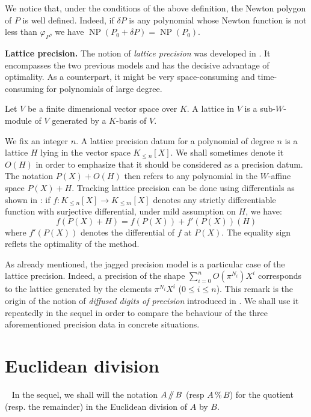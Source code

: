 \documentclass{sig-alternate-2013}
\DeclareMathOperator{\NP}{NP}
\renewcommand{\mod}{\,\%\,}
\renewcommand{\div}{\,/\hspace{-0.3em}/\,}
\def\todo#1{\ \!\!{\color{red} #1}}
\begin{document}
We notice that, under the conditions of the above definition, the
Newton polygon of $P$ is well defined. Indeed, if $\delta P$ is any
polynomial whose Newton function is not less than $\varphi_P$, we
have $\NP(P_0 + \delta P) = \NP(P_0)$.

\medskip

\noindent
{\bf Lattice precision.}
The notion of \emph{lattice precision} was developed in 
\cite{padicprec}. It encompasses the two previous models and has
the decisive advantage of optimality. As a counterpart, it might be
very space-consuming and time-consuming for polynomials of large
degree.

\begin{deftn}
Let $V$ be a finite dimensional vector space over $K$. A lattice
in $V$ is a sub-$W$-module of $V$ generated by a $K$-basis of
$V$.
\end{deftn}

\noindent
We fix an integer $n$. A lattice precision datum for a polynomial of 
degree $n$ is a lattice $H$ lying in the vector space $K_{\leq n}[X]$. 
We shall sometimes denote it $O(H)$ in order to emphasize that it should 
be considered as a precision datum. The notation $P(X) + O(H)$ then 
refers to any polynomial in the $W$-affine space $P(X) + H$. Tracking
lattice precision can be done using differentials as shown in
\cite[Lemma~3.4 and Proposition~3.12]{padicprec}: if $f : K_{\leq n}[X] 
\to K_{\leq m}[X]$ denotes any strictly differentiable function with
surjective differential, under mild assumption on $H$, we have:
$$f(P(X)+H) = f(P(X)) + f'(P(X))(H)$$
where $f'(P(X))$ denotes the differential of $f$ at $P(X)$. The
equality sign reflets the optimality of the method.

As already mentioned, the jagged precision model is a particular case of 
the lattice precision. Indeed, a precision of the shape $\sum_{i=0}^n 
O(\pi^{N_i}) X^i$ corresponds to the lattice generated by the elements 
$\pi^{N_i} X^i$ ($0 \leq i \leq n$). This remark is the origin of the 
notion of \emph{diffused digits of precision} introduced in 
\cite[Definition 2.3]{preclinalg}. We shall use it repeatedly in the 
sequel in order to compare the behaviour of the three aforementioned 
precision data in concrete situations.

\section{Euclidean division}

\todo{Add introduction.}
In the sequel, we shall will the notation $A \div B$ (resp $A \mod B$)
for the quotient (resp. the remainder) in the Euclidean division of $A$ 
by $B$.
\end{document}
